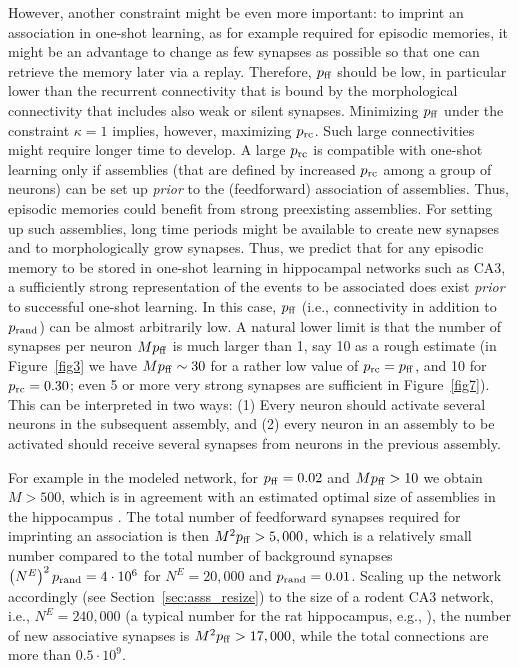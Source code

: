     However, another constraint might be even more important: to imprint an
    association in one-shot learning, as for example required for episodic
    memories, it might be an advantage to change as few synapses as possible so
    that one can retrieve the memory later via a replay. Therefore, $p_{\rm
    ff}$ should be low, in particular lower than the recurrent connectivity
    that is bound by the morphological connectivity that includes also weak or
    silent synapses. Minimizing $p_{\rm ff}$ under the constraint $\kappa =1$
    implies, however, maximizing $p_{\rm rc}$. Such large connectivities might
    require longer time to develop. A large $p_{\rm rc}$ is compatible with
    one-shot learning only if assemblies (that are defined by increased $p_{\rm
    rc}$ among a group of neurons) can be set up {\em prior} to the
    (feedforward) association of assemblies. Thus, episodic memories could
    benefit from strong preexisting assemblies. For setting up such assemblies,
    long time periods might be available to create new synapses and to
    morphologically grow synapses. Thus, we predict that for any episodic
    memory to be stored in one-shot learning in hippocampal networks such as
    CA3, a sufficiently strong representation of the events to be associated
    does exist {\em prior} to successful one-shot learning. In this case,
    $p_{\rm ff}$ (i.e., connectivity in addition to $p_{\rm rand}$) can be
    almost arbitrarily low. A natural lower limit is that the number of
    synapses per neuron $M p_{\rm ff}$ is much larger than 1, say 10 as a rough
    estimate (in Figure~\ref{fig3} we have $M p_{\rm ff} \sim 30$ for a
    rather low value of $p_{\rm rc}=p_{\rm ff}$, and 10 for $p_{\rm rc}=0.30$;
    even 5 or more very strong synapses are sufficient in
    Figure~\ref{fig7}). This can be interpreted in two ways: (1) Every
    neuron should activate several neurons in the subsequent
    assembly, and (2) every neuron in an assembly to be activated should
    receive several synapses from neurons in the previous assembly.

    For example in the modeled network, for $p_{\rm ff} = 0.02$ and $M p_{\rm
    ff} > 10$ we obtain $M > 500$, which is in agreement with an estimated
    optimal size of assemblies in the hippocampus \citep{Leibold2006}. The total
    number of feedforward synapses required for imprinting an association is
    then $M^2 p_{\rm ff} > 5,000$, which is a relatively small number compared
    to the total number of background synapses $\left( N^E \right)^2 p_{\rm
    rand}= 4 \cdot 10^6$ for $N^E=20,000$ and $p_{\rm rand}=0.01$. Scaling up
    the network accordingly (see Section~\ref{sec:asss_resize}) to the size of a rodent
    CA3 network, i.e., $N^E = 240,000$ (a typical number for the rat
    hippocampus, e.g., \citealp{West1991, Rapp1996}), the number of new associative
    synapses is $M^2 p_{\rm ff} > 17,000$, while the total connections are more
    than $0.5 \cdot 10^9$.

